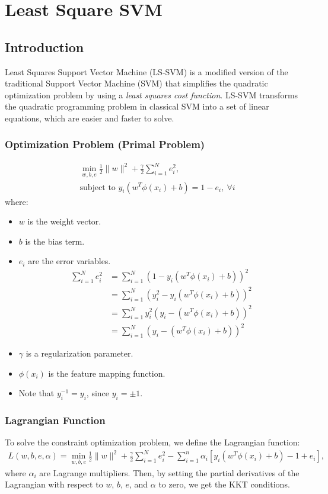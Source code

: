 \chapter{Least Square SVM}
\label{ch:ls_svm}

\section{Introduction}
Least Squares Support Vector Machine (LS-SVM) is a modified version of the traditional Support Vector Machine (SVM) that simplifies the quadratic optimization problem by using a \textit{least squares cost function}. LS-SVM transforms the quadratic programming problem in classical SVM into a set of linear equations, which are easier and faster to solve. 

\subsection{Optimization Problem (Primal Problem)}

\begin{align*}
   &\min_{w, b, e} \frac{1}{2} \lVert w\rVert^2 + \frac{\gamma}{2} \sum_{i=1}^N e_i^2,\\
   &\text{subject to } y_i (w^T \phi(x_i) + b) = 1 - e_i, \ \forall i
\end{align*}
where:
\begin{itemize}
   \item $w$ is the weight vector.
   \item $b$ is the bias term.
   \item $e_i$ are the error variables. 
\begin{align*}
	\sum_{i=1}^N e_i^2 &= \sum_{i=1}^N \left(1-y_i (w^T \phi(x_i) + b)\right)^2\\
					   &= \sum_{i=1}^N \left(y_i^2-y_i (w^T \phi(x_i) + b)\right)^2\\
					   &= \sum_{i=1}^N y_i^2\left(y_i-(w^T \phi(x_i) + b)\right)^2\\
					   &= \sum_{i=1}^N \left(y_i-(w^T \phi(x_i) + b)\right)^2
\end{align*}
   \item $\gamma$ is a regularization parameter.
   \item $\phi(x_i)$ is the feature mapping function.
   \item Note that $y_i^{-1} = y_i$, since $y_i = \pm 1$. 
\end{itemize}

\subsection{Lagrangian Function}
To solve the constraint optimization problem, we define the Lagrangian function: 
\begin{align*}
	L(w, b, e, \alpha) = \min_{w, b, e} \frac{1}{2} \lVert w\rVert^2 + \frac{\gamma}{2} \sum_{i=1}^N e_i^2 - \sum_{i=1}^n \alpha_i \left[ y_i (w^T \phi(x_i) + b) - 1 + e_i \right],
\end{align*}
where $\alpha_i$ are Lagrange multipliers. Then, by setting the partial derivatives of the Lagrangian with respect to $w$, $b$, $e$, and $\alpha$ to zero, we get the KKT conditions.

